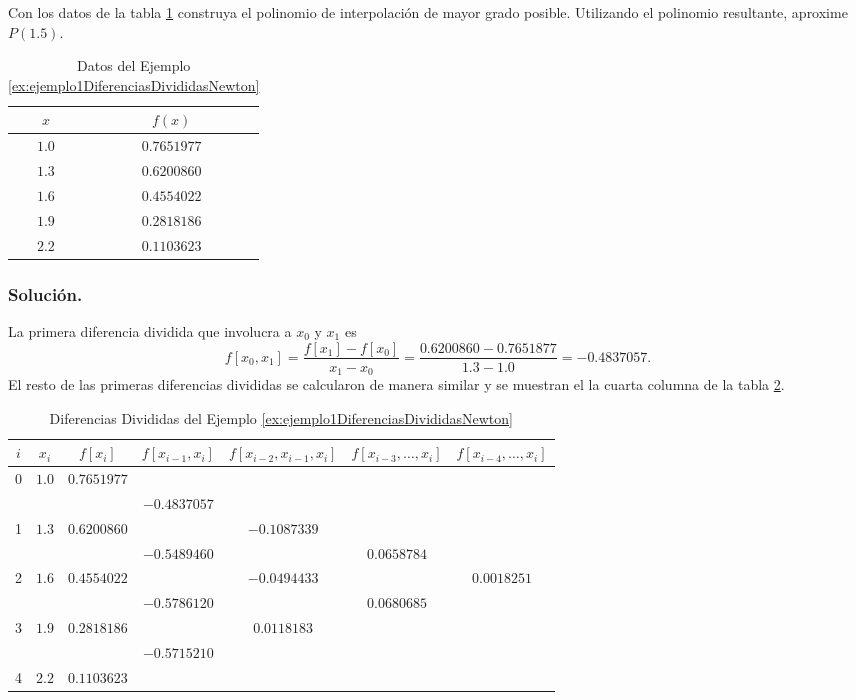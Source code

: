 \begin{exerciseT}
\label{ex:ejemplo1DiferenciasDivididasNewton}
Con los datos de la tabla \ref{table:ejemplo1ADiferenciasDivididasNewton} construya el 
		polinomio de interpolación de mayor grado posible. Utilizando el polinomio resultante, aproxime $P(1.5)$.
	
	\begin{table}[H]
		\label{table:ejemplo1ADiferenciasDivididasNewton}
		\centering
		\begin{tabular}{cc}
			\toprule
			$x$ & $f(x)$\\
			\midrule
			$1.0$ & $0.7651977$ \\
			$1.3$ & $0.6200860$ \\
			$1.6$ & $0.4554022$ \\
			$1.9$ & $0.2818186$ \\
			$2.2$ & $0.1103623$ \\
			\bottomrule
      	\end{tabular}
      	\caption{Datos del Ejemplo \ref{ex:ejemplo1DiferenciasDivididasNewton}}
	\end{table}	
	
	\subsubsection*{Solución.} La primera diferencia dividida que involucra a $x_0$ y $x_1$ es
		$$f[x_0,x_1] = \dfrac{f[x_1] - f[x_0]}{x_1 - x_0} = \dfrac{0.6200860-0.7651877}{1.3-1.0} = -0.4837057.$$
		El resto de las primeras diferencias divididas se calcularon de manera similar y se muestran el la cuarta columna de la tabla
		\ref{table:ejemplo1BDiferenciasDivididasNewton}.
	
	\begin{table}[H]
		\centering
      	\begin{tabular}{ccccccc}
      		\toprule
      		$i$ & $x_i$ & $f[x_i]$ & $f[x_{i-1}, x_i]$ & $f[x_{i-2},x_{i-1},x_i]$ & $f[x_{i-3},\dots,x_i]$ & $f[x_{i-4},\dots, x_i]$\\
			\midrule
			0 & $1.0$ & $0.7651977$ & & & & \\ 
			&&&$-0.4837057$&&&\\
			1 & $1.3$ & $0.6200860$ &  & $-0.1087339$ & & \\
			&&&$-0.5489460$&&$0.0658784$&\\
			2 & $1.6$ & $0.4554022$ &  & $-0.0494433$ & & $0.0018251$\\
			&&&$-0.5786120$&&$0.0680685$&\\
			3 & $1.9$ & $0.2818186$ &  & $ 0.0118183$ &  & \\
			&&&$-0.5715210$&&&\\
			4 & $2.2$ & $0.1103623$ &  &  &  &  \\
			\bottomrule
      	\end{tabular}
      	\caption{Diferencias Divididas del Ejemplo \ref{ex:ejemplo1DiferenciasDivididasNewton}}
      	\label{table:ejemplo1BDiferenciasDivididasNewton}
	\end{table}
	

\end{exerciseT}
